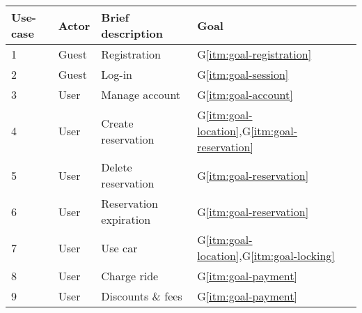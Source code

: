 \begin{center}
  \vspace{0.6cm}
  \begin{tabular}{|l|l|l|l|}
      \hline
      Use-case & Actor & Brief description & Goal \\\hline
      \hline
      1 & Guest & Registration & G\ref{itm:goal-registration} \\\hline
      2 & Guest & Log-in & G\ref{itm:goal-session} \\\hline
      3 & User & Manage account & G\ref{itm:goal-account} \\\hline
      4 & User & Create reservation & G\ref{itm:goal-location},G\ref{itm:goal-reservation} \\\hline
      5 & User & Delete reservation & G\ref{itm:goal-reservation} \\\hline
      6 & User & Reservation expiration & G\ref{itm:goal-reservation} \\\hline
      7 & User & Use car & G\ref{itm:goal-location},G\ref{itm:goal-locking} \\\hline
      8 & User & Charge ride & G\ref{itm:goal-payment} \\\hline
      9 & User & Discounts \& fees & G\ref{itm:goal-payment} \\\hline
  \end{tabular}
\end{center}

